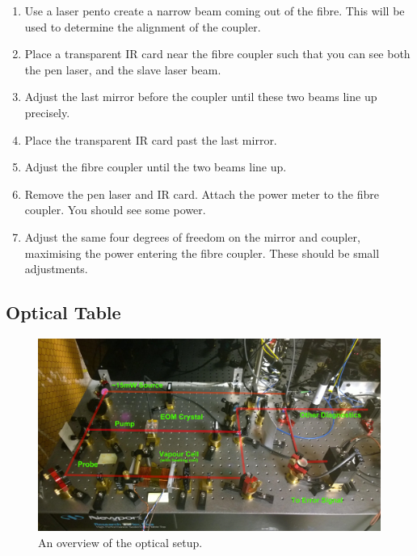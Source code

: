 \begin{enumerate}
 \item Use a laser pen\footnotemark to create a narrow beam coming out of the fibre.  This will be used to determine the alignment of the coupler.
 \item Place a transparent IR card near the fibre coupler such that you can see both the pen laser, and the slave laser beam.
 \item Adjust the last mirror before the coupler until these two beams line up precisely.
 \item Place the transparent IR card past the last mirror.
 \item Adjust the fibre coupler until the two beams line up.
 \item Remove the pen laser and IR card.  Attach the power meter to the fibre coupler.  You should see some power.
 \item Adjust the same four degrees of freedom on the mirror and coupler, maximising the power entering the fibre coupler.  These should be small adjustments.
\end{enumerate}


\subsection{Optical Table}

\begin{figure}
  \includegraphics[width=\textwidth]{figures/optical_setup.png}
  \centering\caption{An overview of the optical setup.}
  \label{optical_setup}
\end{figure}

